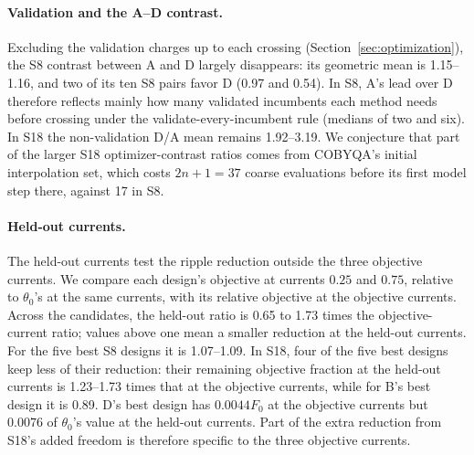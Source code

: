 \documentclass{anvil-paper}
\begin{document}
\paragraph{Validation and the A--D contrast.}
Excluding the validation charges up to each crossing
(Section~\ref{sec:optimization}), the S8 contrast between A and D
largely disappears: its geometric mean is 1.15--1.16, and two of its ten S8 pairs favor D
(0.97 and 0.54). In S8, A's lead over D therefore reflects mainly how
many validated incumbents each method needs before crossing under the
validate-every-incumbent rule (medians of two and six). In S18 the
non-validation D/A mean remains 1.92--3.19. We conjecture that part of the larger
S18 optimizer-contrast ratios comes from COBYQA's initial interpolation set, which costs
$2n+1=37$ coarse evaluations before its first model step there, against
17 in S8.

\paragraph{Held-out currents.}
The held-out currents test the ripple reduction outside the three objective
currents. We compare each design's objective at currents $0.25$ and $0.75$,
relative to $\theta_0$'s at the same currents, with its relative objective
at the objective currents. Across the candidates, the held-out ratio is 0.65
to 1.73 times the objective-current ratio; values above one mean a smaller
reduction at the held-out currents. For the five best S8 designs it
is 1.07--1.09. In S18, four of the five best designs keep less of
their reduction: their remaining objective fraction at the held-out currents
is 1.23--1.73 times that at the objective currents, while for B's best
design it is 0.89. D's best design has $0.0044F_0$ at the objective currents but
$0.0076$ of $\theta_0$'s value at the held-out currents. Part of the extra
reduction from S18's added freedom is therefore specific to the three
objective currents.

\begin{table}[tbp]\centering\small
\caption{Validation charges, repeat~1. ``To crossing'' counts the
validations up to and including the first attaining one, and ``share''
gives the fraction of the time to that target charged to validation, as
medians (ranges) over the method's attained targets and starts. ``Run''
gives the range over starts of the fraction of the whole run's charged time
spent in validation.}
\label{tab:exp2-validation}
\end{table}
\end{document}
